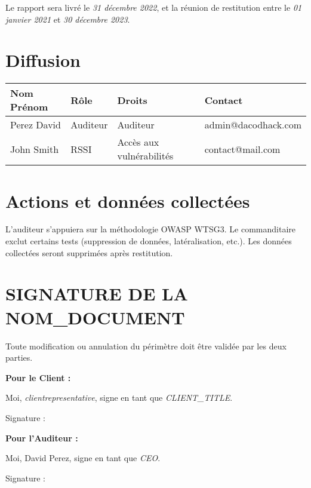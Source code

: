 \documentclass[12pt]{extarticle}
\begin{document}
Le rapport sera livré le \textit{31 décembre 2022}, et la réunion de restitution entre le \textit{01 janvier 2021} et \textit{30 décembre 2023}.

\newpage
\section*{Diffusion}
\begin{tabular}{|l|l|l|l|}
\hline
\textbf{Nom Prénom} & \textbf{Rôle} & \textbf{Droits} & \textbf{Contact} \\ \hline
Perez David & Auditeur & Auditeur & admin@dacodhack.com \\ \hline
John Smith & RSSI & Accès aux vulnérabilités & contact@mail.com \\ \hline
\end{tabular}

\newpage
\section*{Actions et données collectées}
L’auditeur s’appuiera sur la méthodologie OWASP WTSG3. Le commanditaire exclut certains tests (suppression de données, latéralisation, etc.). Les données collectées seront supprimées après restitution.

\newpage
\section*{SIGNATURE DE LA NOM\_DOCUMENT}
Toute modification ou annulation du périmètre doit être validée par les deux parties.

\vfill
\textbf{Pour le Client :}\par
Moi, \textit{clientrepresentative}, signe en tant que \textit{CLIENT\_TITLE}.\par
\vspace{3cm}
Signature :\par
\textbf{Pour l'Auditeur :}\par
Moi, David Perez, signe en tant que \textit{CEO}.\par
\vspace{3cm}
Signature :
\end{document}
